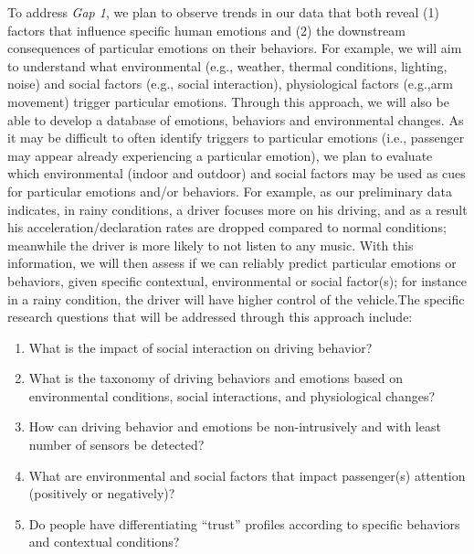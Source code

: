  To address \textit{Gap 1}, we plan to observe trends in our data that both reveal (1) factors that influence specific human emotions and (2) the downstream consequences of particular emotions on their behaviors. For example, we will aim to understand what environmental (e.g., weather, thermal conditions, lighting, noise) and social factors (e.g., social interaction), physiological factors (e.g.,arm movement) trigger particular emotions. Through this approach, we will also be able to develop a database of  emotions, behaviors and environmental changes. As it may be difficult to often identify triggers to particular emotions (i.e., passenger may appear already experiencing a particular emotion), we plan to evaluate which environmental (indoor and outdoor) and social factors may be used as cues for particular emotions and/or behaviors. For example, as our preliminary data indicates, in rainy conditions, a driver focuses more on his driving, and as a result his acceleration/declaration rates are dropped compared to normal conditions; meanwhile the driver is more likely to not listen to any music. With this information, we will then assess if we can reliably predict particular emotions or behaviors, given specific contextual, environmental or social factor(s); for instance in a rainy condition, the driver will have higher control of the vehicle.The specific research questions that will be addressed through this approach include: 
\begin{enumerate}[itemsep=0pt,parsep=0pt,topsep=4pt,leftmargin=0.4in]
    \item What is the impact of social interaction on driving behavior? 
    \item What is the taxonomy of driving behaviors and emotions based on environmental conditions, social interactions, and physiological changes?
    \item How can driving behavior and emotions be non-intrusively and with least number of sensors be detected?
    \item What are environmental and social factors that impact passenger(s) attention (positively or negatively)? 
    \item Do people have differentiating “trust” profiles according to specific behaviors and contextual conditions?  

\end{enumerate}
 

